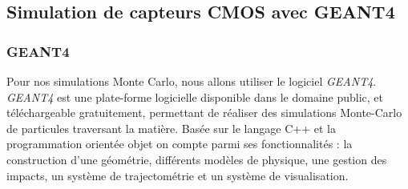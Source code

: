   
  
  \subsection{Simulation de capteurs CMOS avec GEANT4}

    \subsubsection{GEANT4}
    
   
    Pour nos simulations Monte Carlo, nous allons utiliser le logiciel \textit{GEANT4}. \textit{GEANT4} est une plate-forme logicielle disponible dans le domaine public, et téléchargeable gratuitement, permettant de r\'ealiser des simulations Monte-Carlo de particules traversant la mati\`ere. Bas\'ee sur le langage C++ et la programmation orient\'ee objet on compte parmi ses fonctionnalit\'es : la construction d'une géométrie, différents mod\`eles de physique, une gestion des impacts, un syst\`eme de trajectom\'etrie et un syst\`eme de visualisation. 
    
    
